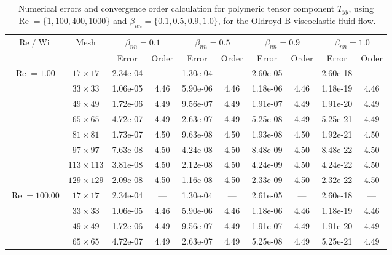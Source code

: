 \documentclass[preprint, 12pt]{elsarticle}
\begin{document}
\begin{center}
\begin{table}[H]
\caption{Numerical errors and convergence order calculation for polymeric tensor component $T_{yy}$, using $\operatorname{Re}=\{1,100,400,1000\}$ and $\beta_{nn}=\{0.1,0.5,0.9,1.0\}$, for the Oldroyd-B viscoelastic fluid flow.\label{Appendix_tab_OldroydBTyyWi5_10}}
\tiny{
    \begin{tabular*}{\textwidth}{@{\extracolsep\fill}cccccccccc@{}}
    \hline
    \multirow{2}{*}{$\operatorname{Re}/\operatorname{Wi}$} & \multirow{2}{*}{Mesh} & \multicolumn{2}{c}{$\beta_{nn}=0.1$}  & \multicolumn{2}{c}{$\beta_{nn}=0.5$}  & \multicolumn{2}{c}{$\beta_{nn}=0.9$}  & \multicolumn{2}{c}{$\beta_{nn}=1.0$}\\ %
     & & Error & Order & Error & Order & Error & Order & Error & Order \\
    \hline
    \multirow{7}{*}{$\operatorname{Re}=1.00$} & $17\times 17$ & 2.34e-04 & --- & 1.30e-04 & --- & 2.60e-05 & --- & 2.60e-18 & --- \\
    & $33\times 33$ & 1.06e-05 & 4.46 & 5.90e-06 & 4.46 & 1.18e-06 & 4.46 & 1.18e-19 & 4.46 \\
    & $49\times 49$ & 1.72e-06 & 4.49 & 9.56e-07 & 4.49 & 1.91e-07 & 4.49 & 1.91e-20 & 4.49 \\
    \multirow{3}{*}{$\operatorname{Wi}=5$} & $65\times 65$ & 4.72e-07 & 4.49 & 2.63e-07 & 4.49 & 5.25e-08 & 4.49 & 5.25e-21 & 4.49 \\
    & $81\times 81$ & 1.73e-07 & 4.50 & 9.63e-08 & 4.50 & 1.93e-08 & 4.50 & 1.92e-21 & 4.50 \\
    & $97\times 97$ & 7.63e-08 & 4.50 & 4.24e-08 & 4.50 & 8.48e-09 & 4.50 & 8.48e-22 & 4.50 \\
    & $113\times 113$ & 3.81e-08 & 4.50 & 2.12e-08 & 4.50 & 4.24e-09 & 4.50 & 4.24e-22 & 4.50 \\
    & $129\times 129$ & 2.09e-08 & 4.50 & 1.16e-08 & 4.50 & 2.33e-09 & 4.50 & 2.32e-22 & 4.50 \\
    \hline
    \multirow{7}{*}{$\operatorname{Re}=100.00$} & $17\times 17$ & 2.34e-04 & --- & 1.30e-04 & --- & 2.61e-05 & --- & 2.60e-18 & --- \\
    & $33\times 33$ & 1.06e-05 & 4.46 & 5.90e-06 & 4.46 & 1.18e-06 & 4.46 & 1.18e-19 & 4.46 \\
    & $49\times 49$ & 1.72e-06 & 4.49 & 9.56e-07 & 4.49 & 1.91e-07 & 4.49 & 1.91e-20 & 4.49 \\
    \multirow{3}{*}{$\operatorname{Wi}=5$} & $65\times 65$ & 4.72e-07 & 4.49 & 2.63e-07 & 4.49 & 5.25e-08 & 4.49 & 5.25e-21 & 4.49 \\

\end{tabular*}}
\end{table}
\end{center}
\end{document}
